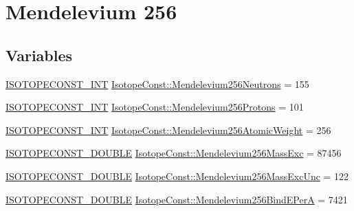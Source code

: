 \hypertarget{group___isotope_const-_mendelevium-_md256}{}\section{Mendelevium 256}
\label{group___isotope_const-_mendelevium-_md256}
\subsection*{Variables}
\begin{DoxyCompactItemize}
\item 
\mbox{\hyperlink{group___isotope_const-_macros_ga5f18360b3e99483a35c32d789e62621c}{I\+S\+O\+T\+O\+P\+E\+C\+O\+N\+S\+T\+\_\+\+I\+NT}} \mbox{\hyperlink{group___isotope_const-_mendelevium-_md256_gaec2850ecc1de9728c17f01ed139257a2}{Isotope\+Const\+::\+Mendelevium256\+Neutrons}} = 155
\item 
\mbox{\hyperlink{group___isotope_const-_macros_ga5f18360b3e99483a35c32d789e62621c}{I\+S\+O\+T\+O\+P\+E\+C\+O\+N\+S\+T\+\_\+\+I\+NT}} \mbox{\hyperlink{group___isotope_const-_mendelevium-_md256_ga36b88bfbc6a3c7af16d5ff7aaa9b82fc}{Isotope\+Const\+::\+Mendelevium256\+Protons}} = 101
\item 
\mbox{\hyperlink{group___isotope_const-_macros_ga5f18360b3e99483a35c32d789e62621c}{I\+S\+O\+T\+O\+P\+E\+C\+O\+N\+S\+T\+\_\+\+I\+NT}} \mbox{\hyperlink{group___isotope_const-_mendelevium-_md256_gac8668fa2a30b4dfa1bcdd213db01b2aa}{Isotope\+Const\+::\+Mendelevium256\+Atomic\+Weight}} = 256
\item 
\mbox{\hyperlink{group___isotope_const-_macros_ga8f45a7272ce02c0b4c65c44636ed719a}{I\+S\+O\+T\+O\+P\+E\+C\+O\+N\+S\+T\+\_\+\+D\+O\+U\+B\+LE}} \mbox{\hyperlink{group___isotope_const-_mendelevium-_md256_ga929bd1bcefa68bf6627fc181fb92c4d0}{Isotope\+Const\+::\+Mendelevium256\+Mass\+Exc}} = 87456
\item 
\mbox{\hyperlink{group___isotope_const-_macros_ga8f45a7272ce02c0b4c65c44636ed719a}{I\+S\+O\+T\+O\+P\+E\+C\+O\+N\+S\+T\+\_\+\+D\+O\+U\+B\+LE}} \mbox{\hyperlink{group___isotope_const-_mendelevium-_md256_ga80206f15298462fc17eca9f28724e3a0}{Isotope\+Const\+::\+Mendelevium256\+Mass\+Exc\+Unc}} = 122
\item 
\mbox{\hyperlink{group___isotope_const-_macros_ga8f45a7272ce02c0b4c65c44636ed719a}{I\+S\+O\+T\+O\+P\+E\+C\+O\+N\+S\+T\+\_\+\+D\+O\+U\+B\+LE}} \mbox{\hyperlink{group___isotope_const-_mendelevium-_md256_ga3edebbebf8acb86dc08d62b814d1826b}{Isotope\+Const\+::\+Mendelevium256\+Bind\+E\+PerA}} = 7421

\end{DoxyCompactItemize}
